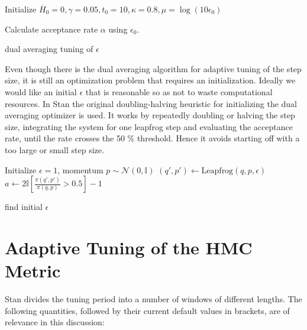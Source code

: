 \documentclass[12pt]{report}
\begin{document}
\begin{algorithm}

Initialize $\overline{H}_0 = 0, \gamma = 0.05, t_0 = 10 ,\kappa = 0.8 , \mu = \log(10\epsilon_0)$ \;
	
	Calculate acceptance rate $\alpha$ using $\epsilon_0$. \;

\caption{dual averaging tuning of $\epsilon$ }
\end{algorithm}

Even though there is the dual averaging algorithm for adaptive tuning of the step size, it is still an optimization problem that requires an initialization. Ideally we would like an initial $\epsilon$ that is reasonable so as not to waste computational resources. In Stan the original doubling-halving heuristic for initializing the dual averaging optimizer is used. It works by repeatedly doubling or halving the step size, integrating the system for one leapfrog step and evaluating the acceptance rate, until the rate crosses the 50 \% threshold. Hence it avoids starting off with a too large or small step size. 
\begin{algorithm}
Initialize $\epsilon = 1$, momentum $p \sim \mathcal{N}(0,\mathbb{I}) $ \;
$(q',p') \leftarrow \text{Leapfrog}(q,p,\epsilon) $ \;
$a \leftarrow 2 \mathbb{I}[ \frac{\pi(q',p')}{\pi(q,p)} > 0.5 ] -1 $\;
\KwRet{$\epsilon$}
\caption{find initial $\epsilon$} 
\end{algorithm}

\section{Adaptive Tuning of the HMC Metric}
Stan divides the tuning period into a number of windows of different lengths. The following quantities, followed by their current default values in brackets, are of relevance in this discussion: 
\end{document}
